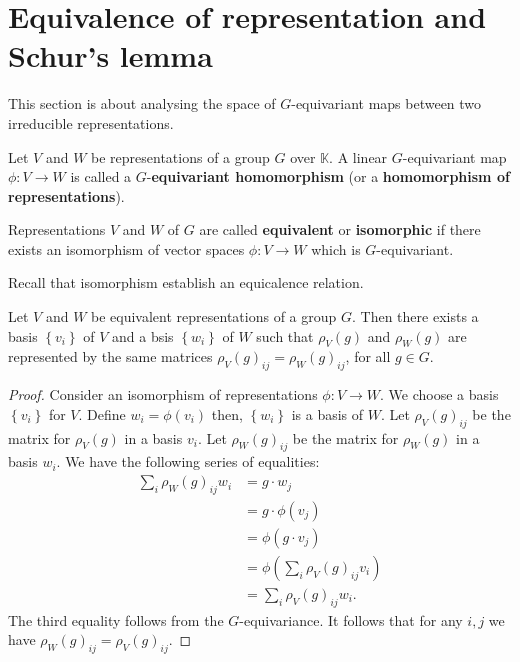 \documentclass[12pt, a4paper]{article}
\newcommand{\KK}{\mathbb{K}}
\begin{document}
\section{Equivalence of representation and Schur's lemma}

\begin{mdnote}
    This section is about analysing the space of \(G\)-equivariant maps between two irreducible representations.
\end{mdnote}

\begin{definition}
    Let \(V\) and \(W\) be representations of a group \(G\) over \(\KK\). A linear \(G\)-equivariant map \(\phi:V \to W\) is called a \(G\)-\textbf{equivariant homomorphism}  (or a \textbf{homomorphism of representations}).
\end{definition}

\begin{definition}
    Representations \(V\) and \(W\) of \(G\) are called \textbf{equivalent} or \textbf{isomorphic} if there exists an isomorphism of vector spaces \(\phi:V \to W\) which is \(G\)-equivariant.
\end{definition}

\begin{mdremark}
    Recall that isomorphism establish an equicalence relation.
\end{mdremark}

\begin{lemma}
    Let \(V\) and \(W\) be equivalent representations of a group \(G\). Then there exists a basis \(\left\{ v_i \right\}\) of \(V\) and a bsis \(\left\{ w_i \right\}\) of \(W\) such that \(\rho_V(g)\) and \(\rho_W(g)\) are represented by the same matrices \(\rho_V(g)_{ij} = \rho_W(g)_{ij}\), for all \(g\in G\).
\end{lemma}

\begin{proof}
    Consider an isomorphism of representations \(\phi:V \to W\). We choose a basis \(\left\{ v_i \right\}\) for \(V\). Define \(w_i = \phi(v_i)\) then, \(\left\{ w_i \right\}\) is a basis of \(W\). Let \(\rho_V(g)_{ij}\) be the matrix for \(\rho_V(g)\) in a basis \(v_i\). Let \(\rho_W(g)_{ij}\) be the matrix for \(\rho_W(g)\) in a basis \(w_i\). We have the following series of equalities:
    \[\begin{aligned}
        \sum_i \rho_W(g)_{ij} w_i &= g\cdot w_j\\
        &= g\cdot \phi(v_j) \\
        &=\phi(g\cdot v_j) \\
        &= \phi \left( \sum_i \rho_V(g)_{ij}v_i \right) \\
        &= \sum_i \rho_V(g)_{ij}w_i.
    \end{aligned}\]
    The third equality follows from the \(G\)-equivariance. It follows that for any \(i,j\) we have \(\rho_W(g)_{ij}=\rho_V(g)_{ij}\).
\end{proof}
\end{document}
